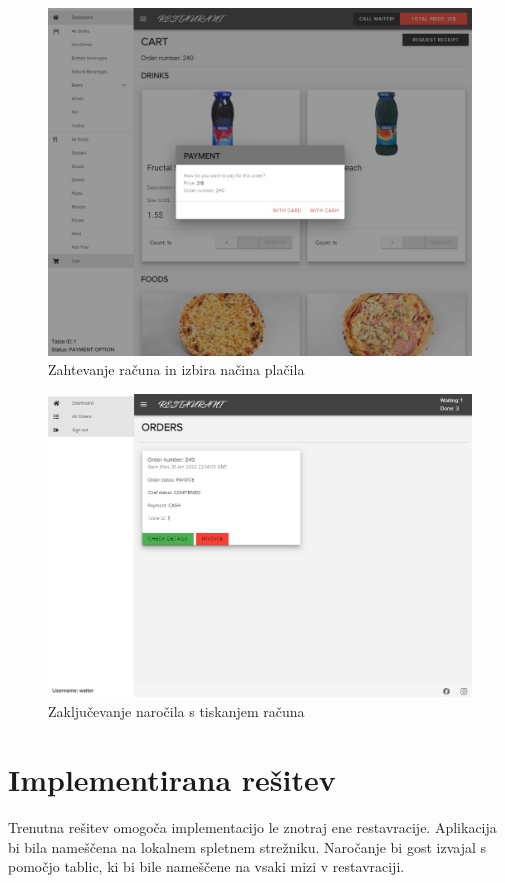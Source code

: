 \documentclass[a4paper, 12pt]{book}
\begin{document}
\begin{figure}
\centering
\includegraphics[width=11.5cm]{order_10.jpg}
\caption{Zahtevanje računa in izbira načina plačila}
\label{Opis6}
\end{figure}
\begin{figure}
\centering
\includegraphics[width=11.5cm]{order_11.jpg}
\caption{Zaključevanje naročila s tiskanjem računa}
\label{Opis66}
\end{figure}


\clearpage
\section{Implementirana rešitev}
Trenutna rešitev omogoča implementacijo le znotraj ene restavracije. Aplikacija bi bila nameščena na lokalnem spletnem strežniku. Naročanje bi gost izvajal s pomočjo tablic, ki bi bile nameščene na vsaki mizi v restavraciji. 
\end{document}
